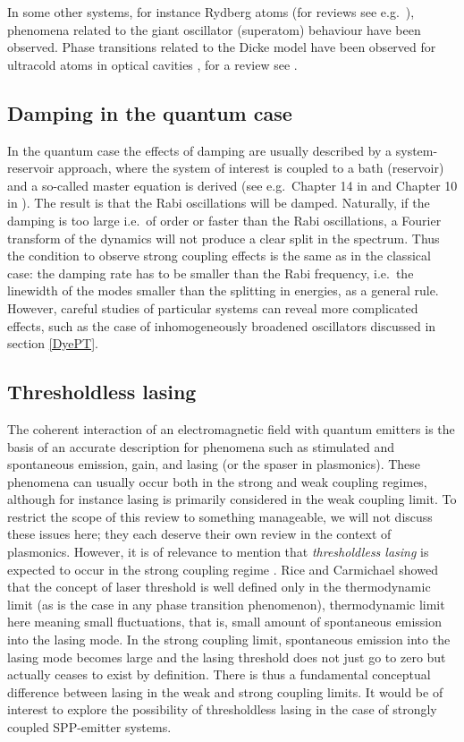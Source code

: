 \documentclass[12pt]{iopart}
\begin{document}
In some other systems, for instance Rydberg atoms (for reviews see e.g.\ \cite{Saffman2010,Comparat2010,Low2012}), phenomena related to the giant oscillator (superatom) behaviour have been observed. Phase transitions related to the Dicke model have been observed for ultracold atoms in optical cavities \cite{Baumann2010}, for a review see \cite{Ritsch2013}. 

\subsection{Damping in the quantum case}

In the quantum case the effects of damping are usually described by a system-reservoir approach, where the system of interest is coupled to a bath (reservoir) and a so-called master equation is derived (see e.g.\ Chapter 14 in \cite{Meystre91} and Chapter 10 in \cite{Walls95}). The result is that the Rabi oscillations will be damped. Naturally, if the damping is too large i.e.\ of order or faster than the Rabi oscillations, a Fourier transform of the dynamics will not produce a clear split in the spectrum. Thus the condition to observe strong coupling effects is the same as in the classical case: the damping rate has to be smaller than the Rabi frequency, i.e.\ the linewidth of the modes smaller than the splitting in energies, as a general rule. However, careful studies of particular systems can reveal more complicated effects, such as the case of inhomogeneously broadened oscillators  
\cite{Houdre1996} discussed in section \ref{DyePT}. 

\subsection{Thresholdless lasing} \label{Thresholdless}

The coherent interaction of an electromagnetic field with quantum emitters is the basis of an accurate description for phenomena such as stimulated and spontaneous emission, gain, and lasing (or the spaser \cite{Bergman2003} in plasmonics). These phenomena can usually occur both in the strong and weak coupling regimes, although for instance lasing is primarily considered in the weak coupling limit. To restrict the scope of this review to something manageable, we will not discuss these issues here; they each deserve their own review in the context of plasmonics. However, it is of relevance to mention that {\it thresholdless lasing} is expected to occur in the strong coupling regime \cite{Rice1994}. Rice and Carmichael \cite{Rice1994} showed that the concept of laser threshold is well defined only in the thermodynamic limit (as is the case in any phase transition phenomenon), thermodynamic limit here meaning small fluctuations, that is, small amount of spontaneous emission into the lasing mode. In the strong coupling limit, spontaneous emission into the lasing mode becomes large and the lasing threshold does not just go to zero but actually ceases to exist by definition. There is thus a fundamental conceptual difference between lasing in the weak and strong coupling limits. It would be of interest to explore the possibility of thresholdless lasing in the case of strongly coupled SPP-emitter systems. 
\end{document}
